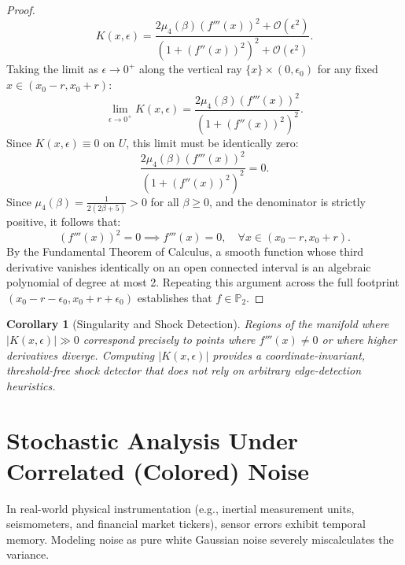 \documentclass[11pt,a4paper]{article}
\newtheorem{corollary}[theorem]{Corollary}
\theoremstyle{definition}
\begin{document}
\begin{proof}
\begin{equation}
K(x, \epsilon) = \frac{2\mu_4(\beta) (f'''(x))^2 + \mathcal{O}(\epsilon^2)}{\left( 1 + (f''(x))^2 \right)^2 + \mathcal{O}(\epsilon^2)}.
\end{equation}
Taking the limit as $\epsilon \to 0^+$ along the vertical ray $\{x\} \times (0, \epsilon_0)$ for any fixed $x \in (x_0 - r, x_0 + r)$:
\begin{equation}
\lim_{\epsilon \to 0^+} K(x, \epsilon) = \frac{2\mu_4(\beta) (f'''(x))^2}{\left( 1 + (f''(x))^2 \right)^2}.
\end{equation}
Since $K(x, \epsilon) \equiv 0$ on $U$, this limit must be identically zero:
\begin{equation}
\frac{2\mu_4(\beta) (f'''(x))^2}{\left( 1 + (f''(x))^2 \right)^2} = 0.
\end{equation}
Since $\mu_4(\beta) = \frac{1}{2(2\beta+5)} > 0$ for all $\beta \ge 0$, and the denominator is strictly positive, it follows that:
\begin{equation}
(f'''(x))^2 = 0 \implies f'''(x) = 0, \quad \forall x \in (x_0 - r, x_0 + r).
\end{equation}
By the Fundamental Theorem of Calculus, a smooth function whose third derivative vanishes identically on an open connected interval is an algebraic polynomial of degree at most 2. Repeating this argument across the full footprint $(x_0 - r - \epsilon_0, x_0 + r + \epsilon_0)$ establishes that $f \in \mathbb{P}_2$.
\end{proof}

\begin{corollary}[Singularity and Shock Detection]
Regions of the manifold where $|K(x, \epsilon)| \gg 0$ correspond precisely to points where $f'''(x) \neq 0$ or where higher derivatives diverge. Computing $|K(x, \epsilon)|$ provides a coordinate-invariant, threshold-free shock detector that does not rely on arbitrary edge-detection heuristics.
\end{corollary}


\section{Stochastic Analysis Under Correlated (Colored) Noise}
\label{sec:noise}

In real-world physical instrumentation (e.g., inertial measurement units, seismometers, and financial market tickers), sensor errors exhibit temporal memory. Modeling noise as pure white Gaussian noise severely miscalculates the variance.
\end{document}
